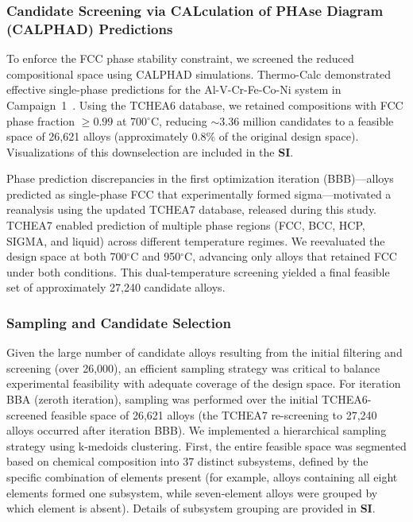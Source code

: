 \subsubsection{Candidate Screening via CALculation of PHAse Diagram (CALPHAD) Predictions}

To enforce the FCC phase stability constraint, we screened the reduced compositional space using CALPHAD simulations. Thermo-Calc demonstrated effective single-phase predictions for the Al-V-Cr-Fe-Co-Ni system in Campaign~1~\cite{hastings2025accelerated}. Using the TCHEA6 database, we retained compositions with FCC phase fraction $\geq 0.99$ at 700$^\circ$C, reducing $\sim$3.36 million candidates to a feasible space of 26,621 alloys (approximately 0.8\% of the original design space). Visualizations of this downselection are included in the \textbf{SI}.

Phase prediction discrepancies in the first optimization iteration (BBB)---alloys predicted as single-phase FCC that experimentally formed sigma---motivated a reanalysis using the updated TCHEA7 database, released during this study. TCHEA7 enabled prediction of multiple phase regions (FCC, BCC, HCP, SIGMA, and liquid) across different temperature regimes. We reevaluated the design space at both 700$^\circ$C and 950$^\circ$C, advancing only alloys that retained FCC under both conditions. This dual-temperature screening yielded a final feasible set of approximately 27,240 candidate alloys.

\subsubsection{Sampling and Candidate Selection}

Given the large number of candidate alloys resulting from the initial filtering and screening (over 26,000), an efficient sampling strategy was critical to balance experimental feasibility with adequate coverage of the design space. For iteration BBA (zeroth iteration), sampling was performed over the initial TCHEA6-screened feasible space of 26,621 alloys (the TCHEA7 re-screening to 27,240 alloys occurred after iteration BBB). We implemented a hierarchical sampling strategy using k-medoids clustering. First, the entire feasible space was segmented based on chemical composition into 37 distinct subsystems, defined by the specific combination of elements present (for example, alloys containing all eight elements formed one subsystem, while seven-element alloys were grouped by which element is absent). Details of subsystem grouping are provided in \textbf{SI}.

